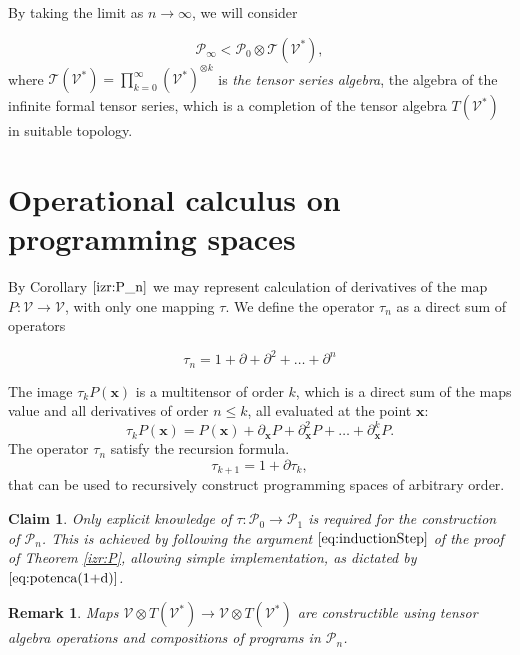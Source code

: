 \documentclass[smallcondensed]{svjour3}
\newcommand{\T}{\mathcal{T}}
\newcommand{\VV}{\mathcal{V}}
\newcommand{\x}{\mathbf{x}}
\newcommand{\dP}{\mathcal{P}}
\newcommand{\D}{\partial}
\newcommand{\sumd}{\tau}
\newtheorem{trditev}{Claim}[section]
\newtheorem{opomba}{Remark}[section]
\begin{document}
By taking the limit as $n\to \infty$, we will consider 
 	
 	\begin{equation}
 	\label{eq:P_algebra}
 	 	    \dP_\infty < \dP_0\otimes \T(\VV^*),
 	\end{equation}
where $\T(\VV^*)=\prod_{k=0}^\infty (\VV^*)^{\otimes k}$ is \emph{the tensor series
  algebra}, the algebra of the  infinite formal tensor series,
which is a completion of the tensor algebra $T(\VV^*)$ in suitable topology.

\section{Operational calculus on programming spaces}\label{sec:operational}



By Corollary $\ref{izr:P_n}$ we may represent calculation of derivatives of the
map $P:\VV\to \VV$, with only one mapping $\sumd$. We define the operator
$\sumd_n$ as a direct sum of operators
 
 \begin{equation}\label{eq:DD}
  	\sumd_n = 1+\D +\D^2 +\ldots + \D^n 
  \end{equation}
  
The image $\sumd_kP(\x)$ is a multitensor of order $k$, which is a direct sum of the maps value and all derivatives of order $n\le k$, all evaluated at the point $\x$:
\begin{equation}
  \label{eq:multi_odvod}
  \sumd_kP(\x) = P(\x)+\D_\x P + \D^2_\x P + \ldots + \D^k_\x P.
\end{equation}
The operator $\sumd_n$ satisfy the recursion formula.
  \begin{equation}
    \label{eq:potenca(1+d)}
    \sumd_{k+1}=1+\D\sumd_{k},
  \end{equation}
that can be used to recursively construct programming spaces of arbitrary order. 
\begin{trditev}
Only explicit knowledge of $\sumd:\dP_0\to\dP_1$ is required for the construction of $\dP_n$. This is achieved by following the argument $\eqref{eq:inductionStep}$ of the proof of Theorem \ref{izr:P}, allowing simple implementation, as dictated by $\eqref{eq:potenca(1+d)}$. 
\end{trditev}
        
       \begin{opomba}\label{rem:vTen}
       Maps $\VV\otimes T(\VV^*)\to \VV\otimes T(\VV^*)$ are constructible using
       tensor algebra operations and compositions of programs in $\dP_n$.
       \end{opomba}
       
\end{document}
